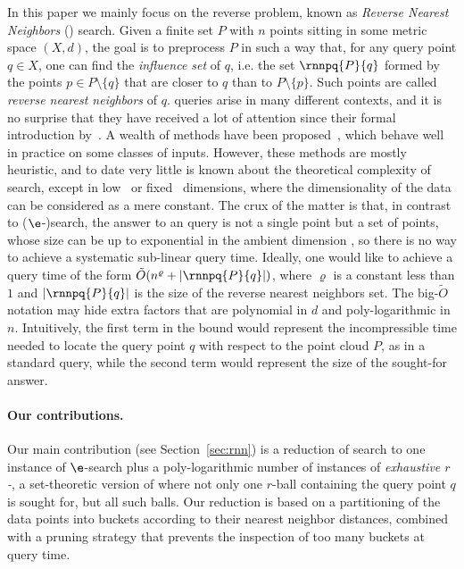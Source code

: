 In this paper we mainly focus on the reverse problem, known as {\em
  Reverse Nearest Neighbors} (\rnn) search. Given a finite set $P$
with $n$ points sitting in some metric space $(X,d)$, the goal is to
preprocess $P$ in such a way that, for any query point $q\in X$, one
can find the {\em influence set} of $q$, i.e. the set $\rnnpq{P}{q}$
formed by the points $p\in P\setminus\{q\}$ that are closer to $q$
than to $P\setminus \{p\}$. Such points are called {\em reverse
  nearest neighbors} of $q$.  \rnn queries arise in many different
contexts, and it is no surprise that they have
received a lot of attention since their formal introduction
by~\citet{KM00}. A wealth of methods have been
proposed~\citep{ABKKPR06,BJKS06,Clarkson03,FP09,
  KMSXZ07,KM00,KJG08,SFT03,SAA00,TPL04,TYM06}, which behave well in
practice on some classes of inputs. However, these methods are mostly
heuristic, and to date very little is known about the theoretical
complexity of \rnn search, except in low~\citep{CDLSV09,MVZ02} or
fixed~\citep{CVY09} dimensions, where the dimensionality of the data
can be considered as a mere constant. The crux of the matter is that,
in contrast to ($\e$-)\nn search, the answer to an \rnn query is not a
single point but a set of points, whose size can be up to exponential
in the ambient dimension \citep{PZ04}, so there is no way to achieve a
systematic sub-linear query time. Ideally, one would like to achieve a
query time of the form $\tilde O(n^\varrho + |\rnnpq{P}{q}|)$, where
$\varrho$ is a constant less than $1$ and $|\rnnpq{P}{q}|$ is the size
of the reverse nearest neighbors set. The big-$\tilde O$ notation may
hide extra factors that are polynomial in $d$ and
poly-logarithmic in $n$.  Intuitively, the first term in the bound
would represent the incompressible time needed to locate the query
point $q$ with respect to the point cloud $P$, as in a standard \nn
query, while the second term would represent the size of the
sought-for answer.

\paragraph*{Our contributions.}
Our main contribution (see Section~\ref{sec:rnn}) is a reduction of
\rnn search to one instance of $\e$-\nn search plus a poly-logarithmic
number of instances of {\em exhaustive $r$-\pleb}, 
a set-theoretic version of \pleb where not only one $r$-ball
containing the query point $q$ is sought for, but all such balls. Our
reduction is based on a partitioning of the data points into buckets
according to their nearest neighbor distances, combined with a pruning
strategy that prevents the inspection of too many buckets at query
time.

